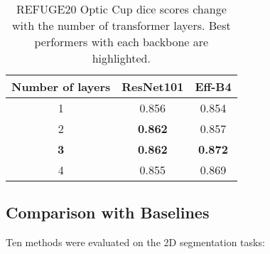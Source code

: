 \documentclass{article}
\begin{document}
\begin{table}[h]
\begin{centering}
\begin{tabular}{|c|c|c|}
\hline 
Number of layers & ResNet101 & Eff-B4 \tabularnewline
\hline 
1 & 0.856 & 0.854 \tabularnewline
\hline 
2 & \textbf{0.862} & 0.857 \tabularnewline
\hline
\textbf{3} & \textbf{0.862} &  \textbf{0.872} \tabularnewline
\hline
4 & 0.855 &  0.869 \tabularnewline
\hline 
\end{tabular}
\caption{REFUGE20 Optic Cup dice scores change with the number of transformer layers. Best performers with each backbone are highlighted.}
\label{num-layers}
\par\end{centering}
\end{table}

\subsection{Comparison with Baselines}
Ten methods were evaluated on the 2D segmentation tasks:
\end{document}
